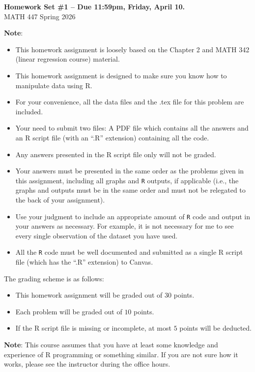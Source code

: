\documentclass[12pt]{article}
\begin{document}
\newcommand{\bm}[1]{\mbox{\boldmath$#1$}}

\begin{center}{\bf Homework Set \#1 -- Due 11:59pm, Friday, April 10.} \\ {\sc MATH 447 Spring 2026}\end{center}
\textbf{Note}: 
\begin{itemize}
\item This homework assignment is loosely based on the Chapter 2 and MATH 342 (linear regression course) material. 
\item This homework assignment is designed to make sure you know how to manipulate data using R.
\item For your convenience, all the data files and the .tex file for this problem are included.
\item Your need to submit two files: A PDF file which contains all the answers and an R script file (with an ``.R'' extension) containing all the code.
\item Any answers presented in the R script file only will not be graded.
\item Your answers must be presented in the same order as the problems given in this assignment, including all graphs and {\tt R} outputs, if applicable (i.e., the graphs and outputs must be in the same order and must not be relegated to the back of your assignment). 
\item Use your judgment to include an appropriate amount of {\tt R} code and output in your answers as necessary. For example, it is not necessary for me to see every single observation of the dataset you have used.
\item All the {\tt R} code must be well documented and submitted as a single R script file (which has the ``.R'' extension) to Canvas. 
\end{itemize}

The grading scheme is as follows:
\begin{itemize}
\item This homework assignment will be graded out of $30$ points.
\item Each problem will be graded out of $10$ points.
\item If the R script file is missing or incomplete, at most $5$ points will be deducted.
\end{itemize}

\textbf{Note}: This course assumes that you have at least some knowledge and experience of R programming or something similar. If you are not sure how it works, please see the instructor during the office hours. 
\end{document}
